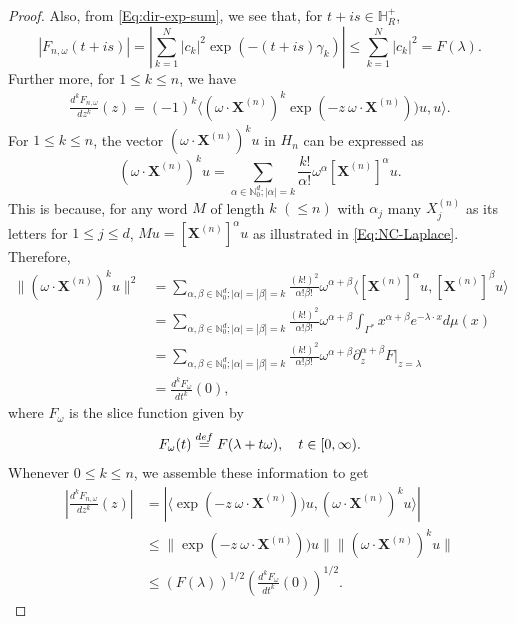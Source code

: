 \documentclass[10pt,a4paper]{amsart}
\newcommand{\bydef}{\stackrel{\rm def}{=}}
\begin{document}
\begin{proof}
    Also, from \eqref{Eq:dir-exp-sum}, we see that, for $t+is \in \mathbb{H}^+_R$,
    $$
    |F_{n, \omega}(t +is)| =\left| \sum_{k=1}^N |c_k|^2 \exp{(-(t+is) \gamma_k )} \right| \leq \sum_{k=1}^N |c_k|^2 = F(\lambda).
    $$
    Further more, for $1\leq k \leq n$, we have
    \begin{align*}
        \frac{d^k F_{n, \omega}}{dz^k}(z) = (-1)^k \langle (\omega \cdot \boldsymbol{X}^{(n)})^k \exp(-z \ \omega \cdot \boldsymbol{X}^{(n)})) u, u \rangle.
    \end{align*}
For $1\leq k \le n$, the vector $(\omega \cdot \boldsymbol{X}^{(n)})^k u$ in $H_n$ can be expressed as 
$$
(\omega \cdot \boldsymbol{X}^{(n)})^k u = \sum_{\alpha \in \mathbb{N}_0^d; |\alpha|=k} \frac{k!}{\alpha!}\omega^\alpha [\boldsymbol{X}^{(n)}]^\alpha u.
$$
This is because, for any word $M$ of length $k$ $(\leq n)$ with $\alpha_j$ many $X^{(n)}_j$ as its letters for $1\leq j \leq d$, $M u = [\boldsymbol{X}^{(n)}]^\alpha u$ as illustrated in \eqref{Eq:NC-Laplace}. Therefore,
\begin{align*}
 \| (\omega \cdot \boldsymbol{X}^{(n)})^k u  \|^2 &= \sum_{\alpha, \beta \in \mathbb{N}_0^d; |\alpha|=|\beta|=k} \frac{(k!)^2}{\alpha! \beta!} \omega^{\alpha + \beta}\langle [\boldsymbol{X}^{(n)}]^\alpha u,  [\boldsymbol{X}^{(n)}]^\beta u\rangle \\
 &= \sum_{\alpha, \beta \in \mathbb{N}_0^d; |\alpha|=|\beta|=k} \frac{(k!)^2}{\alpha! \beta!} \omega^{\alpha + \beta} \int_{\Gamma^*} x^{\alpha + \beta} e^{-\lambda \cdot x} d\mu(x)\\
 &= \sum_{\alpha, \beta \in \mathbb{N}_0^d; |\alpha|=|\beta|=k} \frac{(k!)^2}{\alpha! \beta!} \omega^{\alpha + \beta} \partial^{\alpha + \beta}_z F|_{z=\lambda}\\
 &=\frac{d^k F_\omega}{dt^k}(0),
\end{align*}
    where $F_\omega$ is the slice function given by 
    $$
    F_\omega(t) \bydef F(\lambda + t \omega), \quad t\in [0, \infty).
    $$
    Whenever $0\leq k \leq n$, we assemble these information to get
    \begin{align*}
        \left| \frac{d^k F_{n, \omega}}{dz^k}(z) \right| &= \left| \langle  \exp(-z \ \omega \cdot \boldsymbol{X}^{(n)})) u, (\omega \cdot \boldsymbol{X}^{(n)})^k u \rangle \right| \\
        & \leq \|\exp(-z \ \omega \cdot \boldsymbol{X}^{(n)})) u\| \| (\omega \cdot \boldsymbol{X}^{(n)})^k u\| \\
        & \leq (F(\lambda))^{1/2} \left(\frac{d^k F_\omega}{d t^k}(0)\right)^{1/2}.
    \end{align*}



\end{proof}
\end{document}
